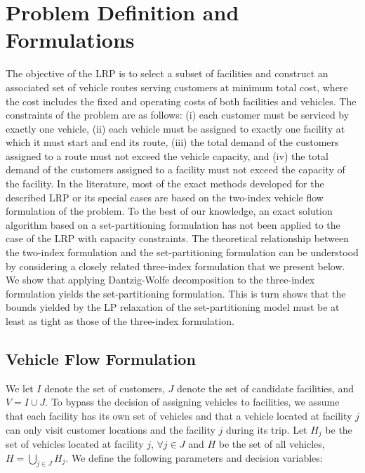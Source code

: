 \section{Problem Definition and Formulations}
\label{sec:ProbDef}
The objective of the LRP is to select a subset of facilities and
construct an associated set of vehicle routes serving customers at
minimum total cost, where the cost includes the fixed and operating
costs of both facilities and vehicles. The constraints of the problem
are as follows: (i) each customer must be serviced by exactly one
vehicle, (ii) each vehicle must be assigned to exactly one facility at
which it must start and end its route, (iii) the total demand of the
customers assigned to a route must not exceed the vehicle capacity,
and (iv) the total demand of the customers assigned to a facility must
not exceed the capacity of the facility. In the literature, most of
the exact methods developed for the described LRP or its special cases
are based on the two-index vehicle flow formulation of the problem. To
the best of our knowledge, an exact solution algorithm based on a
set-partitioning formulation has not been applied to the case of the
LRP with capacity constraints. The theoretical relationship between
the two-index formulation and the set-partitioning formulation can be
understood by considering a closely related three-index formulation
that we present below. 
We show that applying Dantzig-Wolfe
decomposition to the three-index formulation yields the
set-partitioning formulation. This is turn shows that the bounds
yielded by the LP relaxation of the set-partitioning model must be at
least as tight as those of the three-index formulation.

\subsection{Vehicle Flow Formulation}

We let $I$ denote the set of customers, $J$ denote the set of
candidate facilities, and $V = I \cup J$. To bypass the decision 
of assigning vehicles to facilities, we assume that each facility
has its own set of vehicles and that a vehicle located at facility $j$ can
only visit customer locations and the facility $j$ during its trip.
Let $H_j$ be the set of
vehicles located at facility $j$, $\forall j \in J$ and $H$ be the set
of all vehicles, $H = \bigcup_{j \in J}H_j$. We define the following
parameters and decision variables:

